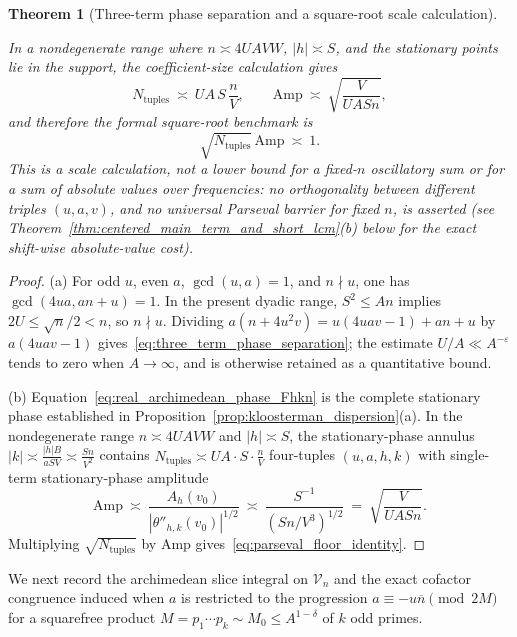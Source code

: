\documentclass[11pt, a4paper]{article}
\theoremstyle{plain}
\newtheorem{theorem}{Theorem}[section]
\theoremstyle{definition}
\begin{document}
\begin{theorem}[Three-term phase separation and a square-root scale calculation]
\begin{enumerate}[(a)]
\begin{equation}
    \end{equation}
    In a nondegenerate range where $n\asymp 4UAVW$, $|h|\asymp S$, and the stationary points lie in the support, the coefficient-size calculation gives
    \[
    N_{\mathrm{tuples}}\ \asymp\ UA\,S\,\frac{n}{V},\qquad \mathrm{Amp}\ \asymp\ \sqrt{\frac{V}{UASn}},
    \]
    and therefore the formal square-root benchmark is
    \begin{equation}\label{eq:parseval_floor_identity}
    \sqrt{N_{\mathrm{tuples}}}\,\mathrm{Amp}\ \asymp\ 1.
    \end{equation}
    This is a scale calculation, not a lower bound for a fixed-$n$ oscillatory sum or for a sum of absolute values over frequencies: no orthogonality between different triples $(u,a,v)$, and no universal Parseval barrier for fixed $n$, is asserted (see Theorem~\ref{thm:centered_main_term_and_short_lcm}(b) below for the exact shift-wise absolute-value cost).
\end{enumerate}
\end{theorem}
\begin{proof}
(a) For odd $u$, even $a$, $\gcd(u,a)=1$, and $n\nmid u$, one has $\gcd(4ua,an+u)=1$. In the present dyadic range, $S^{2}\le An$ implies $2U\le\sqrt{n}/2<n$, so $n\nmid u$. Dividing $a(n+4u^{2}v)=u(4uav-1)+an+u$ by $a(4uav-1)$ gives~\eqref{eq:three_term_phase_separation}; the estimate $U/A\ll A^{-\varepsilon}$ tends to zero when $A\to\infty$, and is otherwise retained as a quantitative bound.

(b) Equation~\eqref{eq:real_archimedean_phase_Fhkn} is the complete stationary phase established in Proposition~\ref{prop:kloosterman_dispersion}(a). In the nondegenerate range $n\asymp 4UAVW$ and $|h|\asymp S$, the stationary-phase annulus $|k|\asymp\frac{|h|B}{aSV}\asymp\frac{Sn}{V^{2}}$ contains $N_{\mathrm{tuples}}\asymp UA\cdot S\cdot\frac{n}{V}$ four-tuples $(u,a,h,k)$ with single-term stationary-phase amplitude
\[
\mathrm{Amp}\ \asymp\ \frac{A_h(v_0)}{|\theta''_{h,k}(v_0)|^{1/2}}\ \asymp\ \frac{S^{-1}}{(Sn/V^{3})^{1/2}}\ =\ \sqrt{\frac{V}{UASn}}.
\]
Multiplying $\sqrt{N_{\mathrm{tuples}}}$ by $\mathrm{Amp}$ gives~\eqref{eq:parseval_floor_identity}.
\end{proof}

We next record the archimedean slice integral on $\mathcal{V}_n$ and the exact cofactor congruence induced when $a$ is restricted to the progression $a\equiv-u\overline{n}\pmod{2M}$ for a squarefree product $M=p_1\cdots p_k\sim M_0\le A^{1-\delta}$ of $k$ odd primes.
\end{document}
